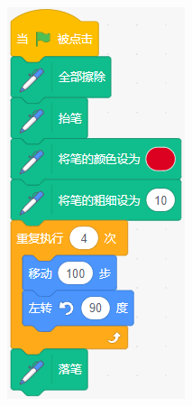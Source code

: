 \documentclass[10pt, a4paper]{article}
\begin{document}
\begin{enumerate}
        \begin{figure}[htbp]
            \centering
            \begin{minipage}[t]{.13\textwidth}
                \centering
                \includegraphics[width=\textwidth]{figure/26.png}

\end{minipage}
\end{figure}
\end{enumerate}
\end{document}
